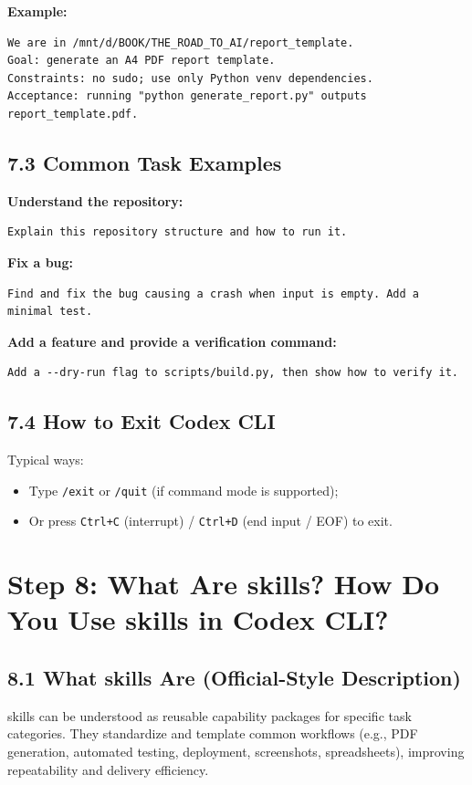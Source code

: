 \documentclass[11pt,a4paper]{article}
\begin{document}
\textbf{Example:}
\begin{lstlisting}
We are in /mnt/d/BOOK/THE_ROAD_TO_AI/report_template.
Goal: generate an A4 PDF report template.
Constraints: no sudo; use only Python venv dependencies.
Acceptance: running "python generate_report.py" outputs report_template.pdf.
\end{lstlisting}

\subsection{7.3 Common Task Examples}
\textbf{Understand the repository:}
\begin{lstlisting}
Explain this repository structure and how to run it.
\end{lstlisting}
\textbf{Fix a bug:}
\begin{lstlisting}
Find and fix the bug causing a crash when input is empty. Add a minimal test.
\end{lstlisting}
\textbf{Add a feature and provide a verification command:}
\begin{lstlisting}
Add a --dry-run flag to scripts/build.py, then show how to verify it.
\end{lstlisting}

\subsection{7.4 How to Exit Codex CLI}
Typical ways:
\begin{itemize}[leftmargin=1.5em]
  \item Type \texttt{/exit} or \texttt{/quit} (if command mode is supported);
  \item Or press \texttt{Ctrl+C} (interrupt) / \texttt{Ctrl+D} (end input / EOF) to exit.
\end{itemize}

\section{Step 8: What Are skills? How Do You Use skills in Codex CLI?}
\subsection{8.1 What skills Are (Official-Style Description)}
skills can be understood as reusable capability packages for specific task categories. They standardize and template common workflows (e.g., PDF generation, automated testing, deployment, screenshots, spreadsheets), improving repeatability and delivery efficiency.
\end{document}
